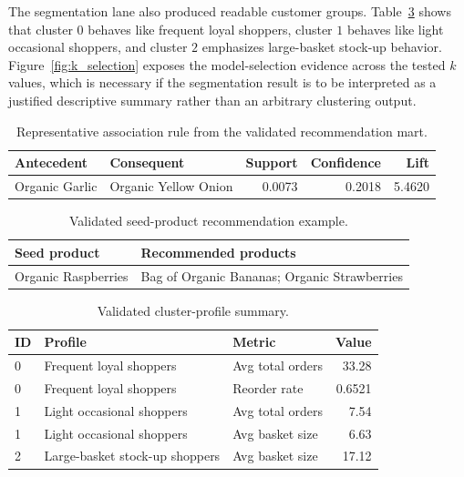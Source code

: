 \documentclass[journal]{IEEEtran}
\begin{document}
The segmentation lane also produced readable customer groups. Table~\ref{tab:cluster_profiles} shows that cluster \(0\) behaves like frequent loyal shoppers, cluster \(1\) behaves like light occasional shoppers, and cluster \(2\) emphasizes large-basket stock-up behavior. Figure~\ref{fig:k_selection} exposes the model-selection evidence across the tested \(k\) values, which is necessary if the segmentation result is to be interpreted as a justified descriptive summary rather than an arbitrary clustering output.

\begin{table}[!t]
\caption{Representative association rule from the validated recommendation mart.}
\label{tab:top_rule}
\centering
\footnotesize
\begin{tabular}{p{1.7cm} p{1.8cm} r r r}
\toprule
\textbf{Antecedent} & \textbf{Consequent} & \textbf{Support} & \textbf{Confidence} & \textbf{Lift} \\
\midrule
Organic Garlic & Organic Yellow Onion & 0.0073 & 0.2018 & 5.4620 \\
\bottomrule
\end{tabular}
\end{table}

\begin{table}[!t]
\caption{Validated seed-product recommendation example.}
\label{tab:seed_recommendation}
\centering
\footnotesize
\begin{tabular}{p{2.5cm} p{4.0cm}}
\toprule
\textbf{Seed product} & \textbf{Recommended products} \\
\midrule
Organic Raspberries & Bag of Organic Bananas; Organic Strawberries \\
\bottomrule
\end{tabular}
\end{table}

\begin{table}[!t]
\caption{Validated cluster-profile summary.}
\label{tab:cluster_profiles}
\centering
\footnotesize
\begin{tabular}{p{0.4cm} p{2.2cm} p{2.0cm} r}
\toprule
\textbf{ID} & \textbf{Profile} & \textbf{Metric} & \textbf{Value} \\
\midrule
0 & Frequent loyal shoppers & Avg total orders & 33.28 \\
0 & Frequent loyal shoppers & Reorder rate & 0.6521 \\
1 & Light occasional shoppers & Avg total orders & 7.54 \\
1 & Light occasional shoppers & Avg basket size & 6.63 \\
2 & Large-basket stock-up shoppers & Avg basket size & 17.12 \\
\bottomrule
\end{tabular}
\end{table}
\end{document}

